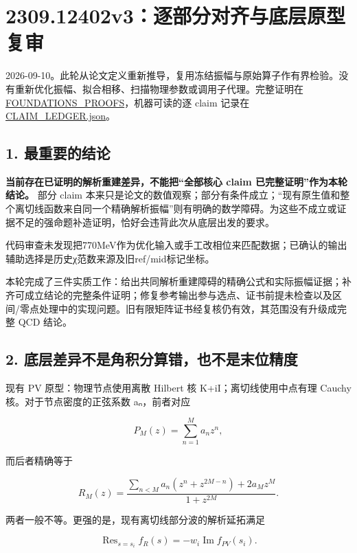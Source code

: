\documentclass[
  11pt,
  a4paper,
]{article}
\author{}
\date{}
\begin{document}
\section{2309.12402v3：逐部分对齐与底层原型复审}\label{v3ux9010ux90e8ux5206ux5bf9ux9f50ux4e0eux5e95ux5c42ux539fux578bux590dux5ba1}

2026-09-10。此轮从论文定义重新推导，复用冻结振幅与原始算子作有界检验。没有重新优化振幅、拟合相移、扫描物理参数或调用子代理。完整证明在
\href{../../evidence/FOUNDATIONS_PROOFS_20260910.md}{FOUNDATIONS\_PROOFS}，机器可读的逐
claim 记录在 \url{CLAIM_LEDGER.json}。

\subsection{1. 最重要的结论}\label{ux6700ux91cdux8981ux7684ux7ed3ux8bba}

\textbf{当前存在已证明的解析重建差异，不能把``全部核心 claim
已完整证明''作为本轮结论。} 部分 claim
本来只是论文的数值观察；部分有条件成立；``现有原生值和整个离切线函数来自同一个精确解析振幅''则有明确的数学障碍。为这些不成立或证据不足的强命题补造证明，恰好会违背此次从底层出发的要求。

代码审查未发现把770MeV作为优化输入或手工改相位来匹配数据；已确认的输出辅助选择是历史χ范数来源及旧ref/mid标记坐标。

本轮完成了三件实质工作：给出共同解析重建障碍的精确公式和实际振幅证据；补齐可成立结论的完整条件证明；修复参考输出参与选点、证书前提未检查以及区间/零点处理中的实现问题。旧有限矩阵证书经复核仍有效，其范围没有升级成完整
QCD 结论。

\subsection{2.
底层差异不是角积分算错，也不是末位精度}\label{ux5e95ux5c42ux5deeux5f02ux4e0dux662fux89d2ux79efux5206ux7b97ux9519ux4e5fux4e0dux662fux672bux4f4dux7cbeux5ea6}

现有 PV 原型：物理节点使用离散 Hilbert 核 K+iI；离切线使用中点有理
Cauchy 核。对于节点密度的正弦系数 aₙ，前者对应

\[
P_M(z)=\sum_{n=1}^M a_nz^n,
\]

而后者精确等于

\[
R_M(z)=\frac{\sum_{n<M}a_n(z^n+z^{2M-n})+2a_Mz^M}{1+z^{2M}}.
\]

两者一般不等。更强的是，现有离切线部分波的解析延拓满足

\[
\operatorname{Res}_{s=s_i}f_R(s)=-w_i\operatorname{Im}f_{PV}(s_i).
\]
\end{document}
